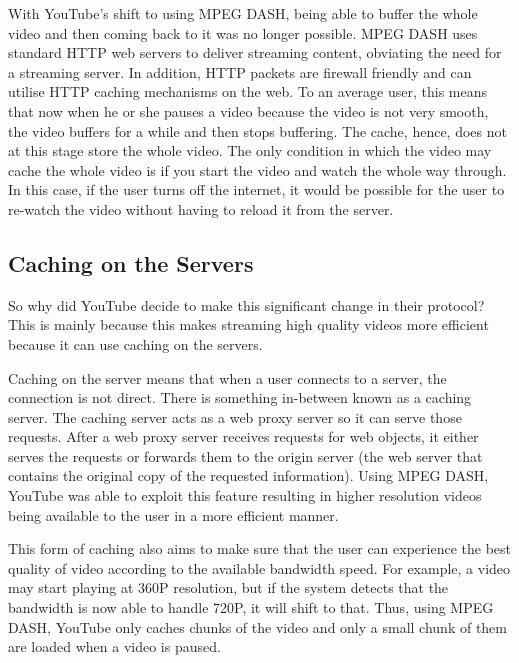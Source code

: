 With YouTube's shift to using MPEG DASH, being able to buffer the whole video and then coming back to it was no longer possible. MPEG DASH uses standard HTTP web servers to deliver streaming content, obviating the need for a streaming server. In addition, HTTP packets are firewall friendly and can utilise HTTP caching mechanisms on the web. To an average user, this means that now when he or she pauses a video because the video is not very smooth, the video buffers for a while and then stops buffering. The cache, hence, does not at this stage store the whole video. The only condition in which the video may cache the whole video is if you start the video and watch the whole way through. In this case, if the user turns off the internet, it would be possible for the user to re-watch the video without having to reload it from the server.

\subsection{Caching on the Servers}
So why did YouTube decide to make this significant change in their protocol? This is mainly  because this makes streaming high quality videos more efficient because it can use caching on the servers.

Caching on the server means that when a user connects to a server, the connection is not direct. There is something in-between known as a caching server. The caching server acts as a web proxy server so it can serve those requests. After a web proxy server receives requests for web objects, it either serves the requests or forwards them to the origin server (the web server that contains the original copy of the requested information). Using MPEG DASH, YouTube was able to exploit this feature resulting in higher resolution videos being available to the user in a more efficient manner.

This form of caching also aims to make sure that the user can experience the best quality of video according to the available bandwidth speed. For example, a video may start playing at 360P  resolution, but if the system detects that the bandwidth is now able to handle 720P, it will shift to that. Thus, using MPEG DASH, YouTube only caches chunks of the video and only a small chunk of them are loaded when a video is paused.

